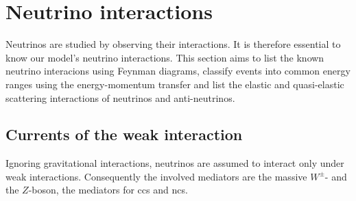\section{Neutrino interactions}
Neutrinos are studied by observing their interactions.
It is therefore essential to know our model's neutrino interactions.
This section aims to list the known neutrino interacions using Feynman diagrams, classify events into common energy ranges using the energy-momentum transfer and list the elastic and quasi-elastic scattering interactions of neutrinos and anti-neutrinos.

\subsection{Currents of the weak interaction}
Ignoring gravitational interactions, neutrinos are assumed to interact only under weak interactions.
Consequently the involved mediators are the massive $W^\pm$- and the $Z$-boson, the mediators for \glspl{cc} and \glspl{nc}.

